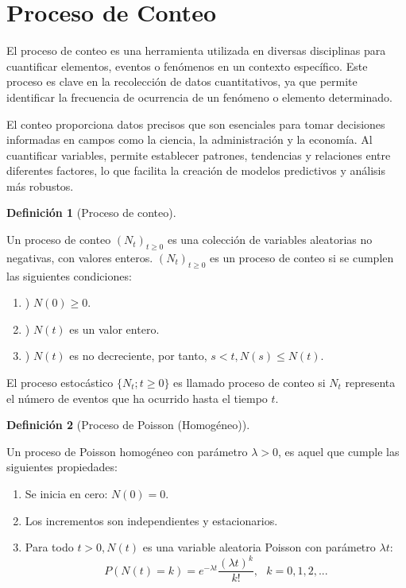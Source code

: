 \documentclass[
  us-letterpaper,
]{scrreprt}
\theoremstyle{plain}
\theoremstyle{plain}
\theoremstyle{definition}
\newtheorem{definition}{Definición}[chapter]
\theoremstyle{remark}
\begin{document}
\section{Proceso de Conteo}\label{proceso-de-conteo}

El proceso de conteo es una herramienta utilizada en diversas
disciplinas para cuantificar elementos, eventos o fenómenos en un
contexto específico. Este proceso es clave en la recolección de datos
cuantitativos, ya que permite identificar la frecuencia de ocurrencia de
un fenómeno o elemento determinado.

El conteo proporciona datos precisos que son esenciales para tomar
decisiones informadas en campos como la ciencia, la administración y la
economía. Al cuantificar variables, permite establecer patrones,
tendencias y relaciones entre diferentes factores, lo que facilita la
creación de modelos predictivos y análisis más robustos.

\begin{definition}[Proceso de
conteo]\protect\hypertarget{def-proc_cont}{}\label{def-proc_cont}

Un proceso de conteo \((N_t)_{t\geq0}\) es una colección de variables
aleatorias no negativas, con valores enteros. \((N_t)_{t\geq0}\) es un
proceso de conteo si se cumplen las siguientes condiciones:

\begin{enumerate}
\def\labelenumi{\alph{enumi}.}
\item
  ) \(N(0) \geq 0\).
\item
  ) \(N(t)\) es un valor entero.
\item
  ) \(N(t)\) es no decreciente, por tanto, \(s < t, N(s) \leq  N(t)\).
\end{enumerate}

El proceso estocástico \(\{N_t; t\geq0\}\) es llamado proceso de conteo
si \(N_t\) representa el número de eventos que ha ocurrido hasta el
tiempo \(t\).

\end{definition}

\begin{definition}[Proceso de Poisson
(Homogéneo)]\protect\hypertarget{def-proc_poi_hom}{}\label{def-proc_poi_hom}

Un proceso de Poisson homogéneo con parámetro \(\lambda > 0\), es aquel
que cumple las siguientes propiedades:

\begin{enumerate}
\def\labelenumi{\alph{enumi}.}
\item
  Se inicia en cero: \(N(0) = 0\).
\item
  Los incrementos son independientes y estacionarios.
\item
  Para todo \(t > 0, N(t)\) es una variable aleatoria Poisson con
  parámetro \(\lambda t:\)
  \[P(N(t) = k) = e^{−λt} \frac{(λt)^k}{k!},\ \ \ k = 0, 1, 2, . . . \]
\end{enumerate}

\end{definition}
\end{document}
